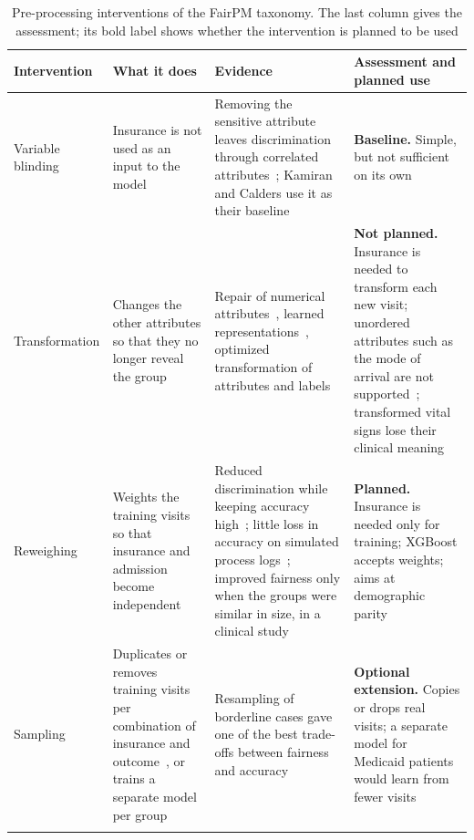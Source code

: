 \begin{table}[htbp]
  \centering
  \footnotesize
  \caption{Pre-processing interventions of the FairPM taxonomy. The last column gives the assessment; its bold label shows whether the intervention is planned to be used}\label{table::preprocessing}
  \begin{tabularx}{\textwidth}{@{}>{\raggedright\arraybackslash}p{2.5cm}>{\raggedright\arraybackslash}X>{\raggedright\arraybackslash}X>{\raggedright\arraybackslash}X@{}}
    \toprule
    \textbf{Intervention} & \textbf{What it does} & \textbf{Evidence} & \textbf{Assessment and planned use} \\
    \midrule
    Variable blinding & Insurance is not used as an input to the model & Removing the sensitive attribute leaves discrimination through correlated attributes~\cite{pedreschi2008discrimination,qafari2019fairness,kamiran2012data}; Kamiran and Calders use it as their baseline~\cite{kamiran2012data} & \textbf{Baseline.} Simple, but not sufficient on its own \\ \addlinespace[0.8ex]
    Transformation & Changes the other attributes so that they no longer reveal the group & Repair of numerical attributes~\cite{feldman2015certifying}, learned representations~\cite{zemel2013learning}, optimized transformation of attributes and labels~\cite{calmon2017optimized} & \textbf{Not planned.} Insurance is needed to transform each new visit; unordered attributes such as the mode of arrival are not supported~\cite{feldman2015certifying}; transformed vital signs lose their clinical meaning \\ \addlinespace[0.8ex]
    Reweighing & Weights the training visits so that insurance and admission become independent & Reduced discrimination while keeping accuracy high~\cite{kamiran2012data}; little loss in accuracy on simulated process logs~\cite{dasilva2025towards}; improved fairness only when the groups were similar in size, in a clinical study~\cite{sanchezmarques2026addressing} & \textbf{Planned.} Insurance is needed only for training; XGBoost accepts weights; aims at demographic parity \\ \addlinespace[0.8ex]
    Sampling & Duplicates or removes training visits per combination of insurance and outcome~\cite{kamiran2012data}, or trains a separate model per group~\cite{revoredo2026fairpm} & Resampling of borderline cases gave one of the best trade-offs between fairness and accuracy~\cite{kamiran2012data} & \textbf{Optional extension.} Copies or drops real visits; a separate model for Medicaid patients would learn from fewer visits \\ \addlinespace[0.8ex]

\end{tabularx}
\end{table}
